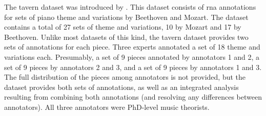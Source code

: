 

The \gls{tavern} dataset was introduced by
\textcite{devaney2015theme}. This dataset consists of
\gls{rna} annotations for sets of piano theme and variations
by Beethoven and Mozart. The dataset contains a total of 27
sets of theme and variations, 10 by Mozart and 17 by
Beethoven. Unlike most datasets of this kind, the
\gls{tavern} dataset provides two sets of annotations for
each piece. Three experts annotated a set of 18 theme and
variations each. Presumably, a set of 9 pieces annotated by
annotators 1 and 2, a set of 9 pieces by annotators 2 and 3,
and a set of 9 pieces by annotators 1 and 3. The full
distribution of the pieces among annotators is not provided,
but the dataset provides both sets of annotations, as well
as an integrated analysis resulting from combining both
annotations (and resolving any differences between
annotators). All three annotators were PhD-level music
theorists.